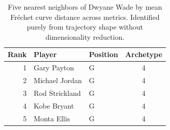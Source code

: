 \begin{table}[htbp]
  \centering\small
  \begin{tabular}{rllc}
    \toprule
    Rank & Player & Position & Archetype \\
    \midrule
    1 & Gary Payton & G & 4 \\
    2 & Michael Jordan & G & 4 \\
    3 & Rod Strickland & G & 4 \\
    4 & Kobe Bryant & G & 4 \\
    5 & Monta Ellis & G & 4 \\
    \bottomrule
  \end{tabular}
  \caption{Five nearest neighbors of Dwyane Wade by mean Fr\'{e}chet curve distance across metrics. Identified purely from trajectory shape without dimensionality reduction.}
  \label{tab:Dwyane_Wade_frechet_curve_neighbors}
\end{table}

